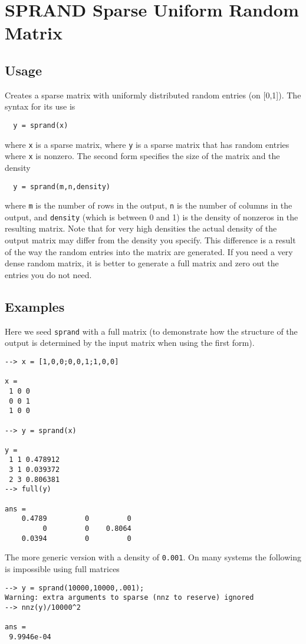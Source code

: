 \section{SPRAND Sparse Uniform Random Matrix}

\subsection{Usage}

Creates a sparse matrix with uniformly distributed random entries (on [0,1]).  The
syntax for its use is
\begin{verbatim}
  y = sprand(x)
\end{verbatim}
where \verb|x| is a sparse matrix, where \verb|y| is a sparse matrix that has
random entries where \verb|x| is nonzero.  The second form specifies the
size of the matrix and the density
\begin{verbatim}
  y = sprand(m,n,density)
\end{verbatim}
where \verb|m| is the number of rows in the output, \verb|n| is the number of 
columns in the output, and \verb|density| (which is between 0 and 1) is
the density of nonzeros in the resulting matrix.  Note that for very
high densities the actual density of the output matrix may differ from
the density you specify.  This difference is a result of the way the
random entries into the matrix are generated.  If you need a very dense
random matrix, it is better to generate a full matrix and zero out the 
entries you do not need.
\subsection{Examples}

Here we seed \verb|sprand| with a full matrix (to demonstrate how the structure
of the output is determined by the input matrix when using the first form).
\begin{verbatim}
--> x = [1,0,0;0,0,1;1,0,0]

x = 
 1 0 0 
 0 0 1 
 1 0 0 

--> y = sprand(x)

y = 
 1 1 0.478912
 3 1 0.039372
 2 3 0.806381
--> full(y)

ans = 
    0.4789         0         0 
         0         0    0.8064 
    0.0394         0         0 
\end{verbatim}
The more generic version with a density of \verb|0.001|.  On many systems the
following is impossible using full matrices
\begin{verbatim}
--> y = sprand(10000,10000,.001);
Warning: extra arguments to sparse (nnz to reserve) ignored
--> nnz(y)/10000^2

ans = 
 9.9946e-04 
\end{verbatim}
